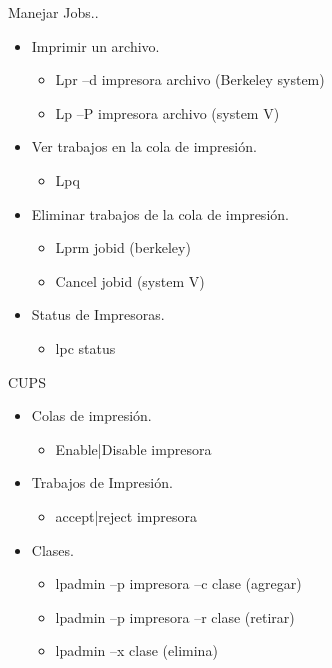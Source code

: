\documentclass{beamer}
\begin{document}
\begin{frame}{Manejar Jobs..}
\begin{itemize}
	\item Imprimir un archivo. 
	\begin{itemize}
		\item Lpr –d impresora archivo (Berkeley system)
		\item Lp –P impresora archivo (system V)
	\end{itemize}
	\item Ver trabajos en la cola de impresión.
	\begin{itemize}
		\item Lpq
	\end{itemize}
	\item Eliminar trabajos de la cola de impresión.
	\begin{itemize}
		\item Lprm jobid (berkeley) 
		\item Cancel jobid (system V)
	\end{itemize}
	\item Status de Impresoras.
	\begin{itemize}
		\item lpc status
	\end{itemize}
	
\end{itemize}
\end{frame}

\begin{frame}{CUPS}
\begin{itemize}
	\item Colas de impresión.
	\begin{itemize}
		\item 	Enable|Disable impresora
	\end{itemize}
	\item Trabajos de Impresión.
	\begin{itemize}
		\item accept|reject impresora
	\end{itemize}
	\item Clases.
	\begin{itemize}
		\item lpadmin –p impresora –c clase (agregar)
		\item lpadmin –p impresora –r clase (retirar)
		\item lpadmin –x clase (elimina)
	\end{itemize}
\end{itemize}
\end{frame}
\end{document}
